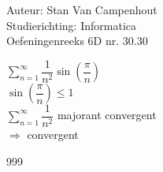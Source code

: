 \documentclass[a4paper]{article}
\begin{document}
  
\noindent \large Auteur: Stan Van Campenhout \\
\noindent \large Studierichting:  Informatica\\
\noindent \large Oefeningenreeks 6D nr. 30.30\\

\medskip

\normalsize

$ \displaystyle\sum\limits_{n = 1}^\infty\dfrac{1}{n^2}\sin\left(\dfrac{\pi}{n}\right) $\\

$ \sin\left(\dfrac{\pi}{n}\right) \leq 1 $\\

$ \displaystyle\sum\limits_{n = 1}^\infty\dfrac{1}{n^2} $ majorant convergent \\

$ \Rightarrow $ convergent \\

\begin{thebibliography}{999}
\end{thebibliography}
\end{document}
